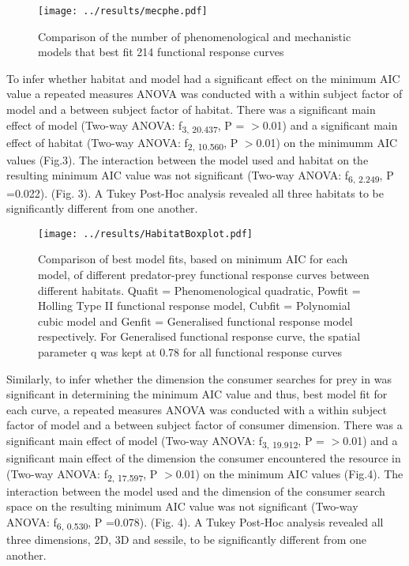 \documentclass[11pt]{article}
\begin{document}
\begin{figure}[h!]
	
	\texttt{[image: ../results/mecphe.pdf]}
	\caption{Comparison of the number of phenomenological and mechanistic models that best fit 214 functional response curves}
	\label{Model Type comparison}
	
\end{figure}

To infer whether habitat and model had a significant effect on the minimum AIC value a repeated measures ANOVA was conducted with a within subject factor of model and a between subject factor of habitat. There was a significant main effect of model (Two-way ANOVA: f\textsubscript{3, 20.437}, P = $>$0.01) and a significant main effect of habitat (Two-way ANOVA: f\textsubscript{2, 10.560}, P $>$0.01) on the minimumm AIC values (Fig.3). The interaction between the model used and habitat on the resulting minimum AIC value was not significant (Two-way ANOVA: f\textsubscript{6, 2.249}, P =0.022).  (Fig. 3). \newline A Tukey Post-Hoc analysis revealed all three habitats to be significantly different from one another. 

\begin{figure}[h!]
	\centering 
	\texttt{[image: ../results/HabitatBoxplot.pdf]}
	\caption{Comparison of best model fits, based on minimum AIC for each model, of different predator-prey functional response curves between different habitats. Quafit = Phenomenological quadratic, Powfit = Holling Type II functional response model, Cubfit = Polynomial cubic model and Genfit = Generalised functional response model respectively. For Generalised functional response curve, the spatial parameter q was kept at 0.78 for all functional response curves }
	\label{Habitat Boxplot of model types}
\end{figure}

Similarly, to infer whether the dimension the consumer searches for prey in was significant in determining the minimum AIC value and thus, best model fit for each curve, a repeated measures ANOVA was conducted with a within subject factor of model and a between subject factor of consumer dimension. There was a significant main effect of model (Two-way ANOVA: f\textsubscript{3, 19.912}, P = $>$0.01) and a significant main effect of the dimension the consumer encountered the resource in (Two-way ANOVA: f\textsubscript{2, 17.597}, P $>$0.01) on the minimum AIC values (Fig.4). The interaction between the model used and the dimension of the consumer search space on the resulting minimum AIC value was not significant (Two-way ANOVA: f\textsubscript{6, 0.530}, P =0.078).  (Fig. 4). \newline A Tukey Post-Hoc analysis revealed all three dimensions, 2D, 3D and sessile,  to be significantly different from one another. 
\end{document}
